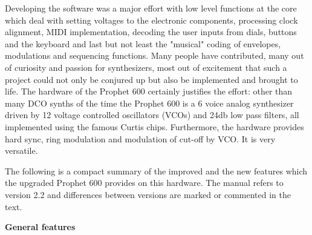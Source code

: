 \documentclass[landscape, 11pt, oneside]{report}
\newenvironment{flowtext}{\addmargin[0cm]{7cm}}{\endaddmargin} %
\begin{document}
\begin{flowtext}
Developing the software was a major effort with low level functions at the core which deal with setting voltages to the electronic components, processing clock alignment, MIDI implementation, decoding the user inputs from dials, buttons and the keyboard and last but not least the "musical" coding of envelopes, modulations and sequencing functions. Many people have contributed, many out of curiosity and passion for synthesizers, most out of excitement that such a project could not only be conjured up but also be implemented and brought to life. The hardware of the Prophet 600 certainly justifies the effort: other than many DCO synths of the time the Prophet 600 is a 6 voice analog synthesizer driven by 12 voltage controlled oscillators (VCOs) and 24db low pass filters, all implemented using the famous Curtis chips\cite{curtis}. Furthermore, the hardware provides hard sync, ring modulation and modulation of cut-off by VCO. It is very versatile.

The following is a compact summary of the improved and the  new features which the upgraded Prophet 600 provides on this hardware. The manual refers to version 2.2 and differences between versions are marked or commented in the text. 

\textbf{General features}
  

\end{flowtext}
\end{document}
